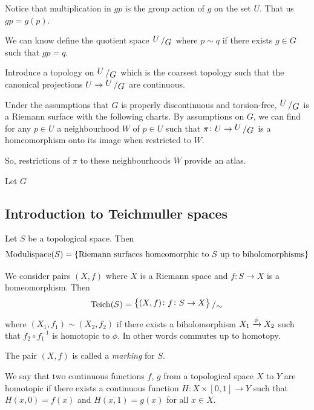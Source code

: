 \documentclass[11pt,a4paper]{article}
\begin{document}
\begin{remark}
  Notice that multiplication in $gp$ is the group action of $g$ on the 
  set $U$. That us $gp = g(p)$.
\end{remark}

We can know define the quotient space $\bigslant{U}{G}$ where
$p \sim q$ if there exists $g \in G$ such that $gp = q$.

Introduce a topology on $\bigslant{U}{G}$ which is the coarsest topology
such that the canonical projections $U \to \bigslant{U}{G}$ are continuous.

Under the assumptions that $G$ is properly discontinuous and torsion-free,
$\bigslant{U}{G}$ is a Riemann surface with the following charts.
By assumptions on $G$, we can find for any $p \in U$ a neighbourhood $W$ of
$p \in U$ such that $\pi \colon U \to \bigslant{U}{G}$ is a homeomorphism
onto its image when restricted to $W$.

So, restrictions of $\pi$ to these neighbourhoods $W$ provide an atlas.

\begin{definition}
  Let $G$
\end{definition}

\subsection{Introduction to Teichmuller spaces}
Let $S$ be a topological space.
Then
\[
  \mathrm{Modulispace}(S) = 
  \left\{\text{Riemann surfaces homeomorphic to $S$ up to biholomorphisms}\right\}
\]
\begin{definition}
  We consider pairs $(X,f)$ where $X$ is a Riemann space and
  $f \colon S \to X$ is a homeomorphism.
  Then
  \[
    \mathrm{Teich}(S) = 
    \bigslant{\set{(X,f) \colon f \colon S \to X}}{\sim}
  \]
  where $(X_1,f_1) \sim (X_2,f_2)$ if there exists a biholomorphism 
  $X_1 \xrightarrow{\phi} X_2$ such that $f_2 \circ f_1^{-1}$ is homotopic to
  $\phi$.
  In other words
  commutes up to homotopy.
\end{definition}

\begin{remark}
  The pair $(X,f)$ is called a \emph{marking} for $S$.
\end{remark}

\begin{definition}[Homotopy]
  We say that two continuous functions $f$, $g$ from a topological space $X$
  to $Y$ are homotopic if there exists a continuous function 
  $H \colon X \times [0,1] \to Y$ such that $H(x,0) = f(x)$ and
  $H(x,1) = g(x)$ for all $x \in X$.
\end{definition}
\end{document}

